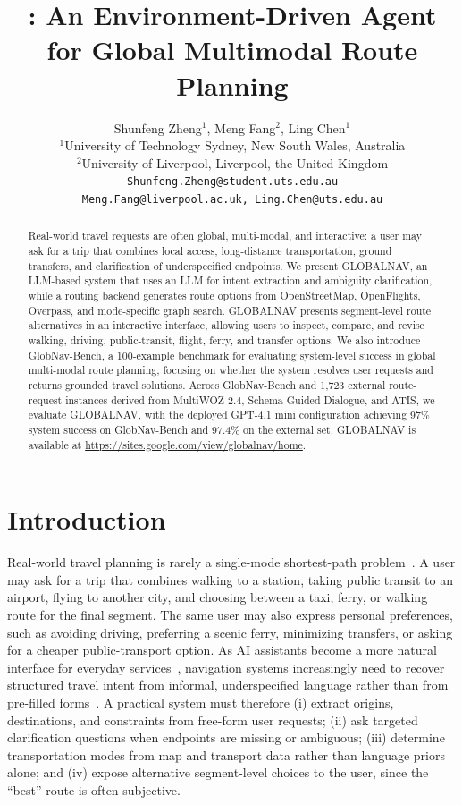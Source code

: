 \documentclass[11pt]{article}
\title{\sys: An Environment-Driven Agent for Global Multimodal Route Planning}
\author{
  Shunfeng Zheng$^{1}$, Meng Fang$^{2}$, Ling Chen$^{1}$ \\
  $^{1}$University of Technology Sydney, New South Wales, Australia \\
  $^{2}$University of Liverpool, Liverpool, the United Kingdom \\
  \texttt{Shunfeng.Zheng@student.uts.edu.au} \\
  \texttt{Meng.Fang@liverpool.ac.uk, Ling.Chen@uts.edu.au}
}
\newcommand{\sys}{GLOBALNAV\xspace}
\newcommand{\bench}{GlobNav-Bench\xspace}
\begin{document}
\maketitle

\begin{abstract}
Real-world travel requests are often global, multi-modal, and interactive: a user may ask for a trip that combines local access, long-distance transportation, ground transfers, and clarification of underspecified endpoints. We present \sys, an LLM-based system that uses an LLM for intent extraction and ambiguity clarification, while a routing backend generates route options from OpenStreetMap, OpenFlights, Overpass, and mode-specific graph search. \sys presents segment-level route alternatives in an interactive interface, allowing users to inspect, compare, and revise walking, driving, public-transit, flight, ferry, and transfer options. We also introduce \bench, a 100-example benchmark for evaluating system-level success in global multi-modal route planning, focusing on whether the system resolves user requests and returns grounded travel solutions. Across \bench and 1,723 external route-request instances derived from MultiWOZ 2.4, Schema-Guided Dialogue, and ATIS, we evaluate \sys, with the deployed GPT-4.1 mini configuration achieving 97\% system success on \bench and 97.4\% on the external set. \sys is available at \url{https://sites.google.com/view/globalnav/home}.




\end{abstract}

\section{Introduction}

Real-world travel planning is rarely a single-mode shortest-path problem~\citep{bast-etal-2016-route-planning}. A user may ask for a trip that combines walking to a station, taking public transit to an airport, flying to another city, and choosing between a taxi, ferry, or walking route for the final segment. The same user may also express personal preferences, such as avoiding driving, preferring a scenic ferry, minimizing transfers, or asking for a cheaper public-transport option. As AI assistants become a more natural interface for everyday services~\citep{rastogi-etal-2020-schema}, navigation systems increasingly need to recover structured travel intent from informal, underspecified language rather than from pre-filled forms~\citep{hemphill-etal-1990-atis}. A practical system must therefore (i) extract origins, destinations, and constraints from free-form user requests; (ii) ask targeted clarification questions when endpoints are missing or ambiguous; (iii) determine transportation modes from map and transport data rather than language priors alone; and (iv) expose alternative segment-level choices to the user, since the ``best'' route is often subjective.
\end{document}

